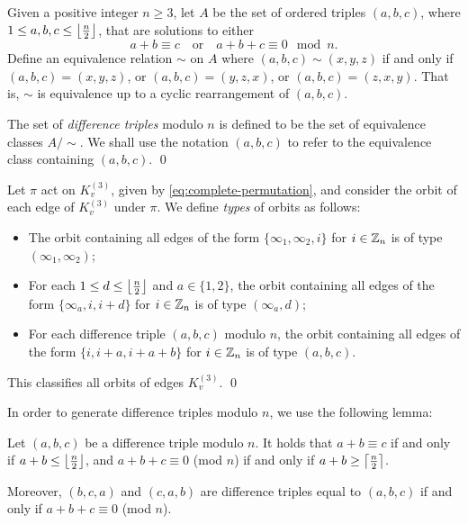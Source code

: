 \begin{definition} \label{def:diff-triple}
Given a positive integer $n \geq 3$, let $A$ be the set of ordered triples $(a, b, c)$, where $1 \leq a, b, c \leq \left\lfloor \frac{n}{2} \right\rfloor$, that are solutions to either
\[
    a + b \equiv c \quad \text{or} \quad a + b + c \equiv 0 \mod n.
\]
Define an equivalence relation $\sim$ on $A$ where $(a, b, c) \sim (x, y, z)$ if and only if $(a, b, c) = (x, y, z)$, or $(a, b, c) = (y, z, x)$, or $(a, b, c) = (z, x, y)$. That is, $\sim$ is equivalence up to a cyclic rearrangement of $(a, b, c)$.

The set of {\em difference triples} modulo $n$ is defined to be the set of equivalence classes $A/\sim$. We shall use the notation $(a, b, c)$ to refer to the equivalence class containing $(a, b, c)$.
\qed
\end{definition}

\begin{definition} \label{def:orbit-types}
Let $\pi$ act on $K_{v}^{(3)}$, given by \eqref{eq:complete-permutation}, and consider the orbit of each edge of $K_{v}^{(3)}$ under $\pi$. We define {\em types} of orbits as follows:

\begin{itemize}
    \item The orbit containing all edges of the form $\{\infty_1, \infty_2, i\}$ for $i \in \mathbb{Z}_n$ is of type $(\infty_1, \infty_2)$;
    \item For each $1 \leq d \leq \left\lfloor \frac{n}{2} \right\rfloor$ and $a \in \{1, 2\}$, the orbit containing all edges of the form $\{\infty_a, i, i+d\}$ for $i \in \mathbb{Z}_n$ is of type $(\infty_a, d)$;
    \item For each difference triple $(a, b, c)$ modulo $n$, the orbit containing all edges of the form $\{i, i+a, i+a+b\}$ for $i \in \mathbb{Z}_n$ is of type $(a, b, c)$.
\end{itemize}

This classifies all orbits of edges $K_{v}^{(3)}$.
\qed
\end{definition}


In order to generate difference triples modulo $n$, we use the following lemma:

\begin{lemma} \label{lem:diff-triple-existence}
Let $(a, b, c)$ be a difference triple modulo $n$.
It holds that $a + b \equiv c$ if and only if $a + b \leq \left\lfloor \frac{n}{2} \right\rfloor$, and $a + b + c \equiv 0$ (mod $n$) if and only if $a + b \geq \left\lceil \frac{n}{2} \right\rceil$.

Moreover, $(b, c, a)$ and $(c, a, b)$ are difference triples equal to $(a, b, c)$ if and only if $a + b + c \equiv 0$ (mod $n$).
\end{lemma}

